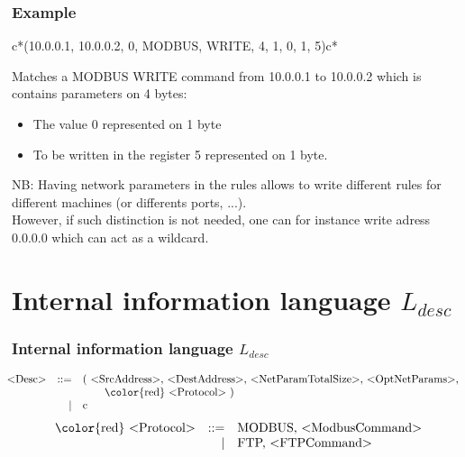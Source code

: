 \documentclass{beamer}
\begin{document}
\begin{frame}
    \frametitle{Example}

    \begin{example}
        \begin{center}
            c*({\color{red}10.0.0.1}, {\color{green} 10.0.0.2}, {\color{blue} 0}, {\color{orange} MODBUS}, {\color{purple} WRITE}, {\color{cyan} 4}, {\color{magenta} 1}, {\color{gray} 0}, {\color{brown} 1}, {\color{pink} 5})c*\\
        \end{center}
        
        Matches a {\color{orange} MODBUS} {\color{purple} WRITE} command from {\color{red} 10.0.0.1} to {\color{green} 10.0.0.2} which is contains parameters on {\color{cyan} 4} bytes:
        \begin{itemize}
            \item The value {\color{gray} 0} represented on {\color{magenta} 1} byte
            \item To be written in the register {\color{pink} 5} represented on {\color{brown} 1} byte.
        \end{itemize}
    \end{example}
    \vfill
    NB: Having network parameters in the rules allows to write different rules for different machines (or differents ports, ...).\\
    \medskip
    However, if such distinction is not needed, one can for instance write adress 0.0.0.0 which can act as a wildcard.
\end{frame}

\section{Internal information language $L_{desc}$}

\begin{frame}
    \tableofcontents[currentsection]
\end{frame}

\begin{frame}
    \frametitle{Internal information language $L_{desc}$}

    {\scriptsize
    \[
        \hspace{-1em}
        \begin{array}{l r l}
            \text{<Desc>} & ::= & \text{( <SrcAddress>, <DestAddress>, <NetParamTotalSize>, <OptNetParams>,} \\
                          &     & \text{~~~~~~{\color{red} <Protocol>} )} \\
                          &   | & \text{c} \\
        \end{array}
    \]
    }
    \pause
    \vfill
    \[
        \begin{array}{l r l}
            \text{{\color{red} <Protocol>}} & ::= & \text{MODBUS, <ModbusCommand>} \\
                                            &   | & \text{FTP, <FTPCommand>} \\
        \end{array}
    \]
\end{frame}
\end{document}
